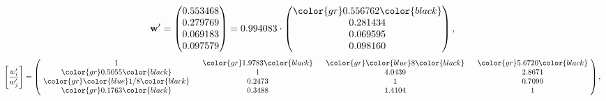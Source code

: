 \begin{example}
\begin{equation*}
\mathbf{w}^{\prime} =
\begin{pmatrix}
0.553468\\
0.279769\\
0.069183\\
0.097579
\end{pmatrix} =
0.994083\cdot
\begin{pmatrix}
\color{gr} 0.556762\color{black} \\
0.281434\\
0.069595\\
0.098160
\end{pmatrix},
\end{equation*}
\begin{equation*}
\left[ \frac{{w}^{\prime}_i}{{w}^{\prime}_j} \right] =
\begin{pmatrix}
$\,\,$ 1 $\,\,$ & $\,\,$\color{gr} 1.9783\color{black} $\,\,$ & $\,\,$\color{gr} \color{blue} 8\color{black} $\,\,$ & $\,\,$\color{gr} 5.6720\color{black} $\,\,$ \\
$\,\,$\color{gr} 0.5055\color{black} $\,\,$ & $\,\,$ 1 $\,\,$ & $\,\,$4.0439$\,\,$ & $\,\,$2.8671  $\,\,$ \\
$\,\,$\color{gr} \color{blue}  1/8\color{black} $\,\,$ & $\,\,$0.2473$\,\,$ & $\,\,$ 1 $\,\,$ & $\,\,$0.7090 $\,\,$ \\
$\,\,$\color{gr} 0.1763\color{black} $\,\,$ & $\,\,$0.3488$\,\,$ & $\,\,$1.4104$\,\,$ & $\,\,$ 1  $\,\,$ \\
\end{pmatrix},
\end{equation*}
\end{example}
\newpage

